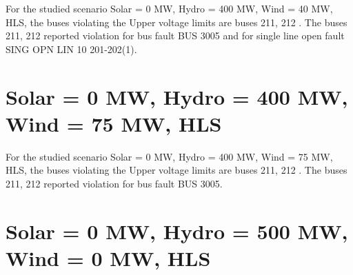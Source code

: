 \documentclass[10pt]{report}
\begin{document}
For the studied scenario Solar = 0 MW, Hydro = 400 MW, Wind = 40 MW, HLS, the buses violating the Upper voltage limits are buses 211, 212 .
The buses 211, 212 reported violation for bus fault BUS 3005 and for single line open fault SING OPN LIN   10 201-202(1).
\begin{table}[H]
\caption{Contingencies reporting bus voltages greater than emergency voltage of 1.1 PU for scenario Solar = 0 MW, Hydro = 400 MW, Wind = 40 MW, HLS}
\label{HVSolar0MWHydro400MWWind40MWHLS}
\centering
{}
\end{table}

\section{Solar = 0 MW, Hydro = 400 MW, Wind = 75 MW, HLS}

For the studied scenario Solar = 0 MW, Hydro = 400 MW, Wind = 75 MW, HLS, the buses violating the Upper voltage limits are buses 211, 212 .
The buses 211, 212 reported violation for bus fault BUS 3005.
\begin{table}[H]
\caption{Contingencies reporting bus voltages greater than emergency voltage of 1.1 PU for scenario Solar = 0 MW, Hydro = 400 MW, Wind = 75 MW, HLS}
\label{HVSolar0MWHydro400MWWind75MWHLS}
\centering
{}
\end{table}

\section{Solar = 0 MW, Hydro = 500 MW, Wind = 0 MW, HLS}
\end{document}
